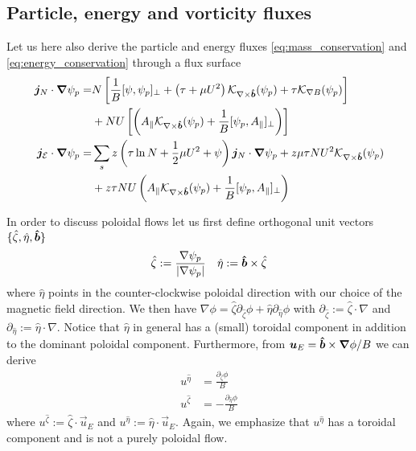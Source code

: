 \subsection{ Particle, energy and vorticity fluxes}
Let us here also derive the particle and energy fluxes \eqref{eq:mass_conservation} and \eqref{eq:energy_conservation} through a flux surface
\begin{align} \label{eq:particle_flux}
 \vec j_{N}\cdot \vec \nabla\psi_p %
 =&
  N\left[\frac{1}{B}[\psi, \psi_p]_\perp + \left(\tau + \mu U^2\right)
   \mathcal K_{\nabla\times\bhat}(\psi_p) + \tau  \mathcal K_{\nabla B}(\psi_p) \right] \nonumber\\
 &+ NU\left [\left( A_\parallel \mathcal
 K_{\nabla\times\bhat}(\psi_p) + \frac{1}{B}[\psi_p, A_\parallel]_\perp\right) \right] \\
 \vec j_{\mathcal E}\cdot \vec \nabla\psi_p =&
\sum_s z\left (\tau\ln N + \frac{1}{2}\mu U^2 + \psi\right) \vec j_N\cdot\vec\nabla\psi_p
+ z \mu\tau NU^2 \mathcal K_{\nabla\times\bhat}(\psi_p) \nonumber\\
&+ z \tau NU
 \left( A_\parallel \mathcal
 K_{\nabla\times\bhat}(\psi_p) + \frac{1}{B}[\psi_p, A_\parallel]_\perp\right)
\label{eq:energy_flux}
\end{align}

In order to discuss poloidal flows let us first define orthogonal unit vectors $\{\hat\zeta, \hat\eta,\bm{\hat{b}}\}$
\begin{align}
\hat\zeta := \frac{\nabla\psi_p}{|\nabla\psi_p|} \quad
\hat \eta := \bm{\hat{b}} \times\hat \zeta
\end{align}
where $\hat\eta$
points in the counter-clockwise poloidal direction with our choice of the magnetic field direction.
We then have $\nabla\phi = \hat \zeta\partial_{\hat\zeta}\phi + \hat\eta\partial_{\hat\eta} \phi$
with $\partial_{\hat\zeta}:= \hat\zeta\cdot\nabla$ and $\partial_{\hat\eta}:=\hat\eta\cdot\nabla$.
Notice that $\hat \eta$ in general has a (small) toroidal component in addition to the dominant poloidal component.
Furthermore, from ${\boldsymbol{u}}_E = \bm{\hat{b}}\times {\boldsymbol{\nabla}}\phi/B$ we can derive
\begin{align}
u^{\hat\eta} &= \frac{\partial_{\hat\zeta} \phi}{B} \\
u^{\hat\zeta} &= -\frac{\partial_{\hat\eta} \phi}{B}
\end{align}
where $u^{\hat\zeta} := \hat\zeta\cdot\vec u_E$ and $u^{\hat\eta}:=\hat\eta\cdot\vec u_E$.
Again, we emphasize that $u^{\hat\eta}$ has a toroidal component and is not a purely poloidal flow.

